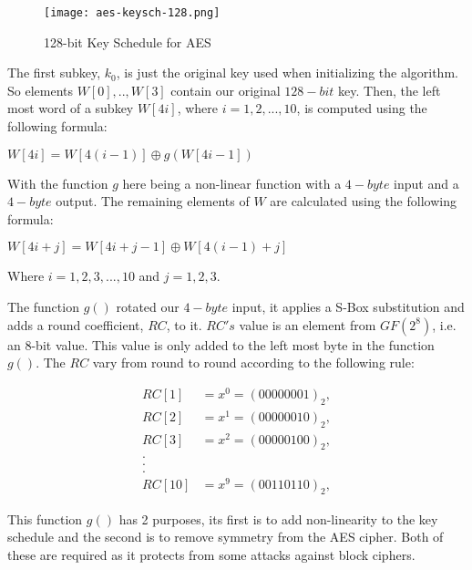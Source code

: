 \begin{figure}[H]
\begin{center}
\texttt{[image: aes-keysch-128.png]}
\end{center}
\caption{128-bit Key Schedule for AES}
\label{AES-KeySch-128}
\end{figure}

The first subkey, $k_0$, is just the original key used when initializing the algorithm. So elements $W[0], .., W[3]$ contain our original $128-bit$ key. Then, the left most word of a subkey $W[4i]$, where $i = 1,2,...,10$, is computed using the following formula:

\begin{center}
$W[4i] = W[4(i - 1)] \oplus g(W[4i - 1])$
\end{center}

With the function $g$ here being a non-linear function with a $4-byte$ input and a $4-byte$ output. The remaining elements of $W$ are calculated using the following formula:

\begin{center}
$W[4i + j] = W[4i + j - 1] \oplus W[4(i - 1) + j]$

Where $i = 1,2,3,...,10$ and $j = 1,2,3$. 
\end{center}

The function $g()$ rotated our $4-byte$ input, it applies a S-Box substitution and adds a round coefficient, $RC$, to it. $RC's$ value is an element from $GF(2^8)$, i.e. an 8-bit value. This value is only added to the left most byte in the function $g()$. The $RC$ vary from round to round according to the following rule:

\begin{center}
\begin{align*}
RC[1] &= x^0 = (0000 0001)_2, \\
RC[2] &= x^1 = (0000 0010)_2, \\
RC[3] &= x^2 = (0000 0100)_2, \\
. \\
. \\
. \\
RC[10] &= x^9 = (0011 0110)_2,  
\end{align*}
\end{center}  

This function $g()$ has 2 purposes, its first is to add non-linearity to the key schedule and the second is to remove symmetry from the AES cipher. Both of these are required as it protects from some attacks against block ciphers.  

